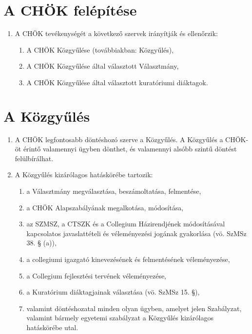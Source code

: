 \documentclass{../styles/rulebook}
\begin{document}
\section{A CHÖK felépítése}

\begin{enumerate}
	\item A CHÖK tevékenységét a következő szervek irányítják és ellenőrzik:
	\begin{enumerate}
		\item A CHÖK Közgyűlése (továbbiakban: Közgyűlés),
		\item A CHÖK Közgyűlése által választott Választmány,
		\item A CHÖK Közgyűlése által választott kuratóriumi diáktagok.
	\end{enumerate}	
\end{enumerate}


\section{A Közgyűlés}

\begin{enumerate}
	\item A CHÖK legfontosabb döntéshozó szerve a Közgyűlés. A Közgyűlés a CHÖK-öt érintő valamennyi ügyben dönthet, és valamennyi alsóbb szintű döntést felülbírálhat.
	\item A Közgyűlés kizárólagos hatáskörébe tartozik:
	\begin{enumerate}
		\item a Választmány megválasztása, beszámoltatása, felmentése,
		\item a CHÖK Alapszabályának megalkotása, módosítása,
		\item az SZMSZ, a CTSZK és a Collegium Házirendjének módosításával kapcsolatos javaslattételi és véleményezési jogának gyakorlása (vö. SzMSz 38. § (a)),
		\item a collegiumi igazgató kinevezésének és felmentésének véleményezése,
		\item a Collegium fejlesztési tervének véleményezése,
		\item a Kuratórium diáktagjainak választása (vö. SzMSz 15. §),
		\item valamint döntéshozatal minden olyan ügyben, amelyet jelen Szabályzat, valamint bármely egyetemi szabályzat a Közgyűlés kizárólagos hatáskörébe utal.
	\end{enumerate}
\end{enumerate}
\end{document}
